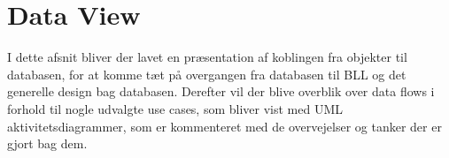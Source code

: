 \section{Data View}
I dette afsnit bliver der lavet en præsentation af koblingen fra objekter til databasen, for at komme tæt på overgangen fra databasen til \gls{BLL} og det generelle design bag databasen. Derefter vil der blive overblik over data flows i forhold til nogle udvalgte use cases, som bliver vist med UML aktivitetsdiagrammer, som er kommenteret med de overvejelser og tanker der er gjort bag dem. 






